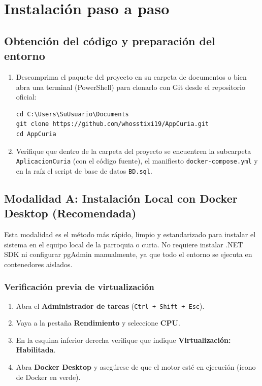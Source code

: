 \chapter{Instalación paso a paso}\label{cap:instalacion}

\section{Obtención del código y preparación del entorno}
\begin{enumerate}
    \item Descomprima el paquete del proyecto en su carpeta de documentos o bien abra una terminal (PowerShell) para clonarlo con Git desde el repositorio oficial:
    \begin{lstlisting}[style=consola]
cd C:\Users\SuUsuario\Documents
git clone https://github.com/whosstixi19/AppCuria.git
cd AppCuria
\end{lstlisting}
    \item Verifique que dentro de la carpeta del proyecto se encuentren la subcarpeta \texttt{AplicacionCuria} (con el código fuente), el manifiesto \texttt{docker-compose.yml} y en la raíz el script de base de datos \texttt{BD.sql}.
\end{enumerate}

\section{Modalidad A: Instalación Local con Docker Desktop (Recomendada)}
Esta modalidad es el método más rápido, limpio y estandarizado para instalar el sistema en el equipo local de la parroquia o curia. No requiere instalar .NET SDK ni configurar pgAdmin manualmente, ya que todo el entorno se ejecuta en contenedores aislados.

\subsection{Verificación previa de virtualización}
\begin{enumerate}
    \item Abra el \textbf{Administrador de tareas} (\texttt{Ctrl + Shift + Esc}).
    \item Vaya a la pestaña \textbf{Rendimiento} y seleccione \textbf{CPU}.
    \item En la esquina inferior derecha verifique que indique \textbf{Virtualización: Habilitada}.
    \item Abra \textbf{Docker Desktop} y asegúrese de que el motor esté en ejecución (ícono de Docker en verde).
\end{enumerate}

